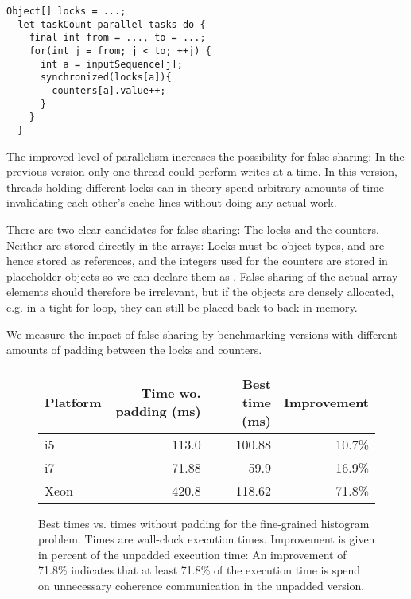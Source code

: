 \begin{code}
\begin{Verbatim}[frame=single]
  Object[] locks = ...;
  let taskCount parallel tasks do {
    final int from = ..., to = ...;
    for(int j = from; j < to; ++j) {
      int a = inputSequence[j];
      synchronized(locks[a]){
        counters[a].value++;
      }
    }
  }
\end{Verbatim}
\end{code}

The improved level of parallelism increases the possibility for false sharing: In
the previous version only one thread could perform writes at a time. In this
version, threads holding different locks can in theory spend arbitrary amounts
of time invalidating each other's cache lines without doing any actual work.

There are two clear candidates for false sharing: The locks and the counters.
Neither are stored directly in the arrays: Locks must be object types, and are
hence stored as references, and the integers used for the counters are stored in
placeholder objects so we can declare them as . False sharing
of the actual array elements should therefore be irrelevant, but if the objects
are densely allocated, e.g. in a tight for-loop, they can still be placed
back-to-back in memory.

We measure the impact of false sharing by benchmarking versions with different
amounts of padding between the locks and counters.


\begin{figure}[hbtp]
	\centering
	\begin{tabular}{l r r r}
		\hline
		\hline
		Platform & Time wo. padding (ms) & Best time (ms) & Improvement \\
		\hline
		i5 & 113.0 & 100.88 & 10.7\% \\
		i7 & 71.88 & 59.9 & 16.9\% \\
		Xeon & 420.8 & 118.62 & 71.8\% \\
		\hline
		\hline
	\end{tabular}
	\caption{Best times vs. times without padding for the fine-grained
	histogram problem. Times are wall-clock execution times. Improvement is
	given in percent of the unpadded execution time: An improvement of
	71.8\% indicates that at least 71.8\% of the execution time is spend on
	unnecessary coherence communication in the unpadded version.}
	\label{table:hist-local}
\end{figure}


